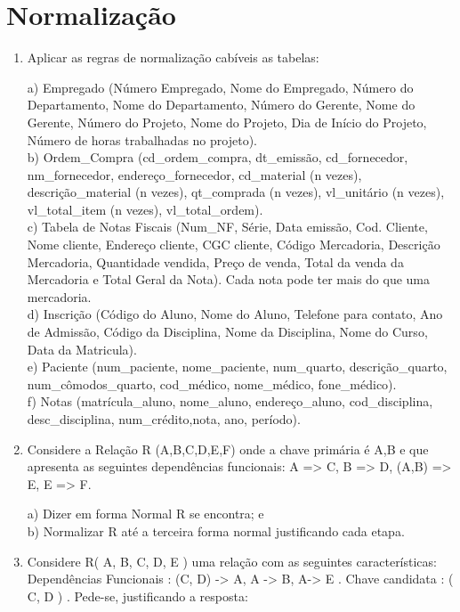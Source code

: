 \documentclass[11pt]{article}
\begin{document}
	\newpage
	
	\section{Normalização}
	
	\begin{enumerate}
		\item Aplicar as regras de normalização cabíveis as tabelas:
		
		a) Empregado (Número Empregado, Nome do Empregado, Número do Departamento, Nome
		do Departamento, Número do Gerente, Nome do Gerente, Número do Projeto, Nome do
		Projeto, Dia de Início do Projeto, Número de horas trabalhadas no projeto).\\
		b) Ordem\_Compra (cd\_ordem\_compra, dt\_emissão, cd\_fornecedor, nm\_fornecedor,
		endereço\_fornecedor, cd\_material (n vezes), descrição\_material (n vezes), qt\_comprada (n
		vezes), vl\_unitário (n vezes), vl\_total\_item (n vezes), vl\_total\_ordem).\\
		c) Tabela de Notas Fiscais (Num\_NF, Série, Data emissão, Cod. Cliente, Nome cliente,
		Endereço cliente, CGC cliente, Código Mercadoria, Descrição Mercadoria, Quantidade
		vendida, Preço de venda, Total da venda da Mercadoria e Total Geral da Nota). Cada nota pode
		ter mais do que uma mercadoria.\\
		d) Inscrição (Código do Aluno, Nome do Aluno, Telefone para contato, Ano de Admissão,
		Código da Disciplina, Nome da Disciplina, Nome do Curso, Data da Matricula).\\
		e) Paciente (num\_paciente, nome\_paciente, num\_quarto, descrição\_quarto,
		num\_cômodos\_quarto, cod\_médico, nome\_médico, fone\_médico).\\
		f) Notas (matrícula\_aluno, nome\_aluno, endereço\_aluno, cod\_disciplina, desc\_disciplina,
		num\_crédito,nota, ano, período).
		
		\item Considere a Relação R (A,B,C,D,E,F) onde a chave primária é A,B e que apresenta as seguintes
		dependências funcionais: A => C, B => D, (A,B) => E, E => F.
		
		a) Dizer em forma Normal R se encontra; e\\
		b) Normalizar R até a terceira forma normal justificando cada etapa. 
		
		\item Considere R( A, B, C, D, E ) uma relação com as seguintes características: Dependências
		Funcionais : (C, D) -> A, A -> B, A-> E . Chave candidata : ( C, D ) . Pede-se, justificando a
		resposta:
		

\end{enumerate}
\end{document}
